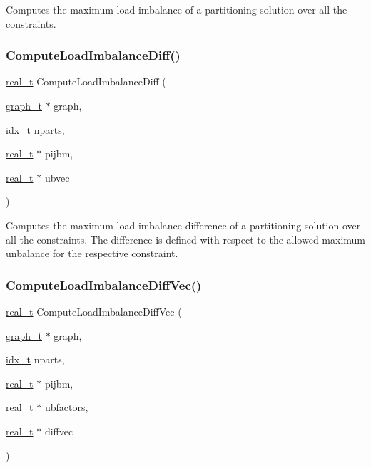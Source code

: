 Computes the maximum load imbalance of a partitioning solution over all the constraints. \mbox{\label{a00945_ad4d848110f5b7dd58d068ea6dc26c49c}} 
\subsubsection{\texorpdfstring{Compute\+Load\+Imbalance\+Diff()}{ComputeLoadImbalanceDiff()}}
{\footnotesize\ttfamily \hyperlink{a00876_a1924a4f6907cc3833213aba1f07fcbe9}{real\+\_\+t} Compute\+Load\+Imbalance\+Diff (\begin{DoxyParamCaption}\item[{\hyperlink{a00734}{graph\+\_\+t} $\ast$}]{graph,  }\item[{\hyperlink{a00876_aaa5262be3e700770163401acb0150f52}{idx\+\_\+t}}]{nparts,  }\item[{\hyperlink{a00876_a1924a4f6907cc3833213aba1f07fcbe9}{real\+\_\+t} $\ast$}]{pijbm,  }\item[{\hyperlink{a00876_a1924a4f6907cc3833213aba1f07fcbe9}{real\+\_\+t} $\ast$}]{ubvec }\end{DoxyParamCaption})}

Computes the maximum load imbalance difference of a partitioning solution over all the constraints. The difference is defined with respect to the allowed maximum unbalance for the respective constraint. \mbox{\label{a00945_a232d17c76d3e7d402ea128d0de5b8138}} 
\subsubsection{\texorpdfstring{Compute\+Load\+Imbalance\+Diff\+Vec()}{ComputeLoadImbalanceDiffVec()}}
{\footnotesize\ttfamily \hyperlink{a00876_a1924a4f6907cc3833213aba1f07fcbe9}{real\+\_\+t} Compute\+Load\+Imbalance\+Diff\+Vec (\begin{DoxyParamCaption}\item[{\hyperlink{a00734}{graph\+\_\+t} $\ast$}]{graph,  }\item[{\hyperlink{a00876_aaa5262be3e700770163401acb0150f52}{idx\+\_\+t}}]{nparts,  }\item[{\hyperlink{a00876_a1924a4f6907cc3833213aba1f07fcbe9}{real\+\_\+t} $\ast$}]{pijbm,  }\item[{\hyperlink{a00876_a1924a4f6907cc3833213aba1f07fcbe9}{real\+\_\+t} $\ast$}]{ubfactors,  }\item[{\hyperlink{a00876_a1924a4f6907cc3833213aba1f07fcbe9}{real\+\_\+t} $\ast$}]{diffvec }\end{DoxyParamCaption})}


